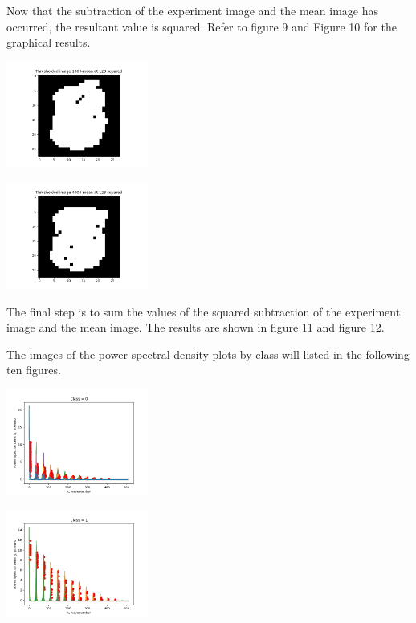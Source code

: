 Now that the subtraction of the experiment image and the mean image has occurred, the resultant value is squared. Refer to figure 9 and Figure 10 for the graphical results.

\begin{center}
\includegraphics[width=0.35\textwidth]{image11.png}
\end{center}

\begin{center}
\includegraphics[width=0.35\textwidth]{image12.png}
\end{center}

The final step is to sum the values of the squared subtraction of the experiment image and the mean image. The results are shown in figure 11 and figure 12.

The images of the power spectral density plots by class will listed in the following ten figures.


\begin{center}
\includegraphics[width=0.35\textwidth]{fft_0.png}
\end{center}

\begin{center}
\includegraphics[width=0.35\textwidth]{fft_1.png}
\end{center}

